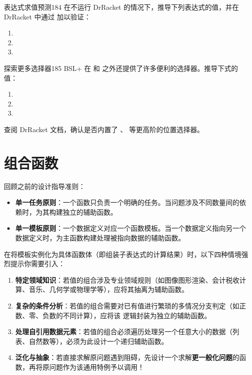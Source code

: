 \begin{exercise}{表达式求值预测}{184}
在不运行 DrRacket 的情况下，推导下列表达式的值，并在 DrRacket 中通过  加以验证：
\begin{enumerate}
  \item {}
  \item {}
  \item {}
\end{enumerate}
\end{exercise}

\begin{exercise}{探索更多选择器}{185}
BSL+ 在  和  之外还提供了许多便利的选择器。推导下式的值：
\begin{enumerate}
  \item {}
  \item {}
  \item {}
\end{enumerate}
查阅 DrRacket 文档，确认是否内置了 、 等更高阶的位置选择器。
\end{exercise}

\section{组合函数}
\label{sec:ch11_composing_functions}

回顾之前的设计指导准则：
\begin{itemize}
  \item \textbf{单一任务原则}：一个函数只负责一个明确的任务。当问题涉及不同数量间的依赖时，为其构建独立的辅助函数。
  \item \textbf{单一模板原则}：一个数据定义对应一个函数模板。当一个数据定义指向另一个数据定义时，为主函数构建处理被指向数据的辅助函数。
\end{itemize}

在将模板实例化为具体函数体（即组装子表达式的计算结果）时，以下四种情境强烈提示你需要引入：
\begin{enumerate}
  \item \textbf{特定领域知识}：若值的组合涉及专业领域规则（如图像图形渲染、会计税收计算、音乐、几何学或物理学等），应将其抽离为辅助函数。
  \item \textbf{复杂的条件分析}：若值的组合需要对已有值进行繁琐的多情况分支判定（如正数、零、负数的不同计算），应将该  逻辑封装为独立的辅助函数。
  \item \textbf{处理自引用数据元素}：若值的组合必须遍历处理另一个任意大小的数据（列表、自然数等），必须为此设计一个递归辅助函数。
  \item \textbf{泛化与抽象}：若直接求解原问题遇到阻碍，先设计一个求解\textbf{更一般化问题}的函数，再将原问题作为该通用特例予以调用！
\end{enumerate}

